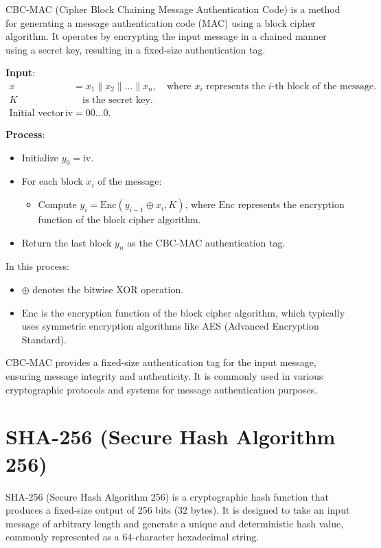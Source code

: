 \documentclass[11pt]{article}
\begin{document}
CBC-MAC (Cipher Block Chaining Message Authentication Code) is a method for generating a message authentication code (MAC) using a block cipher algorithm. It operates by encrypting the input message in a chained manner using a secret key, resulting in a fixed-size authentication tag.

\textbf{Input}:
\begin{align*}
x &= x_1 \mathbin\| x_2 \mathbin\| \ldots \mathbin\| x_n, \quad \text{where } x_i \text{ represents the } i\text{-th block of the message}. \\
K & \quad \text{is the secret key}. \\
\text{Initial vector } \text{iv} &= 00\ldots0.
\end{align*}

\textbf{Process}:
\begin{itemize}
    \item Initialize \( y_0 = \text{iv} \).
    \item For each block \( x_i \) of the message:
    \begin{itemize}
        \item Compute \( y_i = \text{Enc}(y_{i-1} \oplus x_i, K) \), where \( \text{Enc} \) represents the encryption function of the block cipher algorithm.
    \end{itemize}
    \item Return the last block \( y_n \) as the CBC-MAC authentication tag.
\end{itemize}

In this process:
\begin{itemize}
    \item \( \oplus \) denotes the bitwise XOR operation.
    \item \( \text{Enc} \) is the encryption function of the block cipher algorithm, which typically uses symmetric encryption algorithms like AES (Advanced Encryption Standard).
\end{itemize}

CBC-MAC provides a fixed-size authentication tag for the input message, ensuring message integrity and authenticity. It is commonly used in various cryptographic protocols and systems for message authentication purposes.

\section*{SHA-256 (Secure Hash Algorithm 256)}

SHA-256 (Secure Hash Algorithm 256) is a cryptographic hash function that produces a fixed-size output of 256 bits (32 bytes). It is designed to take an input message of arbitrary length and generate a unique and deterministic hash value, commonly represented as a 64-character hexadecimal string.
\end{document}
